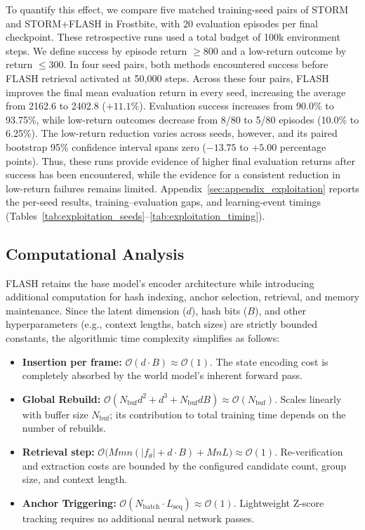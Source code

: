 \documentclass{article} %
\begin{document}
To quantify this effect, we compare five matched training-seed pairs of STORM and STORM+FLASH in Frostbite, with 20 evaluation episodes per final checkpoint. These retrospective runs used a total budget of 100k environment steps. We define success by episode return $\geq 800$ and a low-return outcome by return $\leq 300$. In four seed pairs, both methods encountered success before FLASH retrieval activated at 50,000 steps. Across these four pairs, FLASH improves the final mean evaluation return in every seed, increasing the average from 2162.6 to 2402.8 ($+11.1\%$). Evaluation success increases from 90.0\% to 93.75\%, while low-return outcomes decrease from 8/80 to 5/80 episodes (10.0\% to 6.25\%). The low-return reduction varies across seeds, however, and its paired bootstrap 95\% confidence interval spans zero ($-13.75$ to $+5.00$ percentage points). Thus, these runs provide evidence of higher final evaluation returns after success has been encountered, while the evidence for a consistent reduction in low-return failures remains limited. Appendix~\ref{sec:appendix_exploitation} reports the per-seed results, training--evaluation gaps, and learning-event timings (Tables~\ref{tab:exploitation_seeds}--\ref{tab:exploitation_timing}).

\subsection{Computational Analysis}
FLASH retains the base model's encoder architecture while introducing additional computation for hash indexing, anchor selection, retrieval, and memory maintenance.
Since the latent dimension ($d$), hash bits ($B$), and other hyperparameters (e.g., context lengths, batch sizes) are strictly bounded constants, the algorithmic time complexity simplifies as follows:
\begin{itemize}
    \item \textbf{Insertion per frame:} $\mathcal{O}(d \cdot B) \approx \mathcal{O}(1)$. The state encoding cost is completely absorbed by the world model's inherent forward pass.
    \item \textbf{Global Rebuild:} $\mathcal{O}(N_{\text{buf}} d^2 + d^3 + N_{\text{buf}} d B) \approx \mathcal{O}(N_{\text{buf}})$. Scales linearly with buffer size $N_{\text{buf}}$; its contribution to total training time depends on the number of rebuilds.
    \item \textbf{Retrieval step:} $\mathcal{O}\big(M m n (|f_\theta| + d \cdot B) + M n L\big) \approx \mathcal{O}(1)$. Re-verification and extraction costs are bounded by the configured candidate count, group size, and context length.
    \item \textbf{Anchor Triggering:} $\mathcal{O}(N_{\text{batch}} \cdot L_{\text{seq}}) \approx \mathcal{O}(1)$. Lightweight Z-score tracking requires no additional neural network passes.
\end{itemize}
\end{document}
